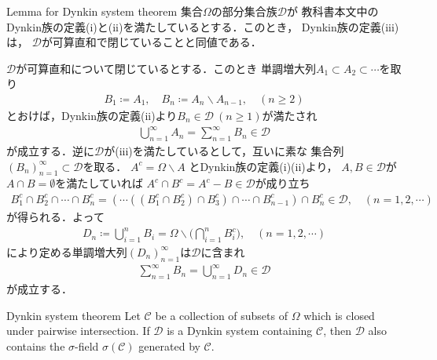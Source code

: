 \begin{itembox}[l]{Lemma for Dynkin system theorem}
		集合$\Omega$の部分集合族$\mathscr{D}$が
		教科書本文中のDynkin族の定義(i)と(ii)を満たしているとする．このとき，
		Dynkin族の定義(iii)は，
		$\mathscr{D}$が可算直和で閉じていることと同値である．
\end{itembox}

\begin{prf}
	$\mathscr{D}$が可算直和について閉じているとする．このとき
	単調増大列$A_1 \subset A_2 \subset \cdots$を取り
	\begin{align}
		B_1 \coloneqq A_1,
		\quad B_n \coloneqq A_n \backslash A_{n-1},
		\quad (n \geq 2)
	\end{align}
	とおけば，Dynkin族の定義(ii)より$B_n \in \mathscr{D}\ (n \geq 1)$が満たされ
	\begin{align}
		\bigcup_{n=1}^{\infty} A_n = \sum_{n=1}^{\infty} B_n \in \mathscr{D} 
	\end{align}
	が成立する．逆に$\mathscr{D}$が(iii)を満たしているとして，互いに素な
	集合列$(B_n)_{n=1}^{\infty} \subset \mathscr{D}$を取る．
	$A^c = \Omega \backslash A$
	とDynkin族の定義(i)(ii)より，
	$A,B \in \mathscr{D}$が$A \cap B = \emptyset$を満たしていれば
	$A^c \cap B^c = A^c - B\in \mathscr{D}$が成り立ち
	\begin{align}
		B_1^c \cap B_2^c \cap \cdots \cap B_n^c
		= \left( \cdots \left( \left( B_1^c \cap B_2^c \right) \cap B_3^c \right) \cap \cdots \cap B_{n-1}^c \right) \cap B_n^c
		\in \mathscr{D},
		\quad (n=1,2,\cdots)
	\end{align}
	が得られる．よって
	\begin{align}
		D_n \coloneqq \bigcup_{i=1}^n B_i = \Omega \backslash \Biggl( \bigcap_{i=1}^n B_i^c \Biggr),
		\quad (n=1,2,\cdots)
	\end{align}
	により定める単調増大列$(D_n)_{n=1}^{\infty}$は$\mathscr{D}$に含まれ
	\begin{align}
		\sum_{n=1}^{\infty} B_n = \bigcup_{n=1}^{\infty} D_n \in \mathscr{D}
	\end{align}
	が成立する．
	\QED
\end{prf}

\begin{itembox}[l]{Dynkin system theorem}
		Let $\mathscr{C}$ be a collection of subsets of $\Omega$ 
		which is closed under pairwise intersection. If $\mathscr{D}$ is 
		a Dynkin system containing $\mathscr{C}$, then $\mathscr{D}$ also 
		contains the $\sigma$-field $\sigma(\mathscr{C})$ generated by $\mathscr{C}$.
\end{itembox}

